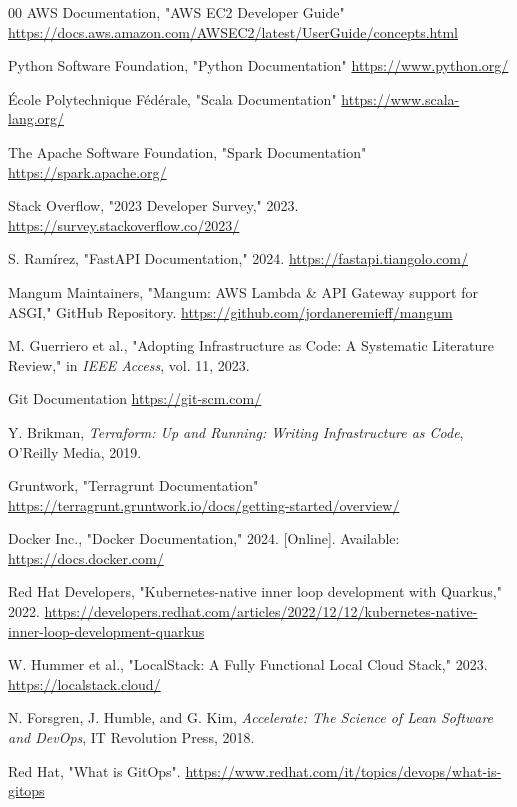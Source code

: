 \begin{thebibliography}{00}
AWS Documentation, "AWS EC2 Developer Guide"
\url{https://docs.aws.amazon.com/AWSEC2/latest/UserGuide/concepts.html}

Python Software Foundation, "Python Documentation"
\url{https://www.python.org/}

École Polytechnique Fédérale, "Scala Documentation"
\url{https://www.scala-lang.org/}

The Apache Software Foundation, "Spark Documentation"
\url{https://spark.apache.org/}

Stack Overflow, "2023 Developer Survey," 2023. \url{https://survey.stackoverflow.co/2023/}

S. Ramírez, "FastAPI Documentation," 2024. \url{https://fastapi.tiangolo.com/}

Mangum Maintainers, "Mangum: AWS Lambda \& API Gateway support for ASGI," GitHub Repository. \url{https://github.com/jordaneremieff/mangum}

M. Guerriero et al., "Adopting Infrastructure as Code: A Systematic Literature Review," in \textit{IEEE Access}, vol. 11, 2023.

Git Documentation
\url{https://git-scm.com/}

Y. Brikman, \textit{Terraform: Up and Running: Writing Infrastructure as Code}, O'Reilly Media, 2019.

Gruntwork, "Terragrunt Documentation"
\url{https://terragrunt.gruntwork.io/docs/getting-started/overview/}

Docker Inc., "Docker Documentation," 2024. [Online]. Available: \url{https://docs.docker.com/}

Red Hat Developers, "Kubernetes-native inner loop development with Quarkus," 2022. \url{https://developers.redhat.com/articles/2022/12/12/kubernetes-native-inner-loop-development-quarkus}

W. Hummer et al., "LocalStack: A Fully Functional Local Cloud Stack," 2023. \url{https://localstack.cloud/}

N. Forsgren, J. Humble, and G. Kim, \textit{Accelerate: The Science of Lean Software and DevOps}, IT Revolution Press, 2018.

Red Hat, "What is GitOps".
\url{https://www.redhat.com/it/topics/devops/what-is-gitops}


\end{thebibliography}
